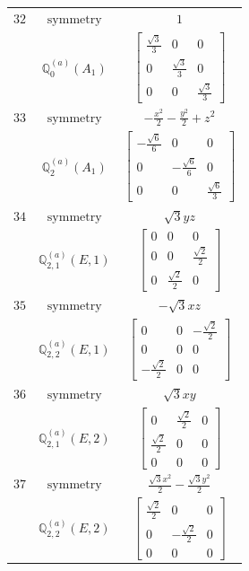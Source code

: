 \documentclass[fleqn,8pt,landscape]{jsarticle}
\begin{document}
\begin{longtable}{ccc}
$ 32 $ & $ \text{symmetry} $ & $ 1 $ \\
$  $ & $ \mathbb{Q}_{0}^{(a)}(A_{1}) $ & $ \begin{bmatrix} \frac{\sqrt{3}}{3} & 0 & 0 \\ 0 & \frac{\sqrt{3}}{3} & 0 \\ 0 & 0 & \frac{\sqrt{3}}{3} \end{bmatrix} $ \\ \hline
$ 33 $ & $ \text{symmetry} $ & $ - \frac{x^{2}}{2} - \frac{y^{2}}{2} + z^{2} $ \\
$  $ & $ \mathbb{Q}_{2}^{(a)}(A_{1}) $ & $ \begin{bmatrix} - \frac{\sqrt{6}}{6} & 0 & 0 \\ 0 & - \frac{\sqrt{6}}{6} & 0 \\ 0 & 0 & \frac{\sqrt{6}}{3} \end{bmatrix} $ \\ \hline
$ 34 $ & $ \text{symmetry} $ & $ \sqrt{3} y z $ \\
$  $ & $ \mathbb{Q}_{2,1}^{(a)}(E,1) $ & $ \begin{bmatrix} 0 & 0 & 0 \\ 0 & 0 & \frac{\sqrt{2}}{2} \\ 0 & \frac{\sqrt{2}}{2} & 0 \end{bmatrix} $ \\ \hline
$ 35 $ & $ \text{symmetry} $ & $ - \sqrt{3} x z $ \\
$  $ & $ \mathbb{Q}_{2,2}^{(a)}(E,1) $ & $ \begin{bmatrix} 0 & 0 & - \frac{\sqrt{2}}{2} \\ 0 & 0 & 0 \\ - \frac{\sqrt{2}}{2} & 0 & 0 \end{bmatrix} $ \\ \hline
$ 36 $ & $ \text{symmetry} $ & $ \sqrt{3} x y $ \\
$  $ & $ \mathbb{Q}_{2,1}^{(a)}(E,2) $ & $ \begin{bmatrix} 0 & \frac{\sqrt{2}}{2} & 0 \\ \frac{\sqrt{2}}{2} & 0 & 0 \\ 0 & 0 & 0 \end{bmatrix} $ \\ \hline
$ 37 $ & $ \text{symmetry} $ & $ \frac{\sqrt{3} x^{2}}{2} - \frac{\sqrt{3} y^{2}}{2} $ \\
$  $ & $ \mathbb{Q}_{2,2}^{(a)}(E,2) $ & $ \begin{bmatrix} \frac{\sqrt{2}}{2} & 0 & 0 \\ 0 & - \frac{\sqrt{2}}{2} & 0 \\ 0 & 0 & 0 \end{bmatrix} $ \\ \hline

\end{longtable}
\end{document}
